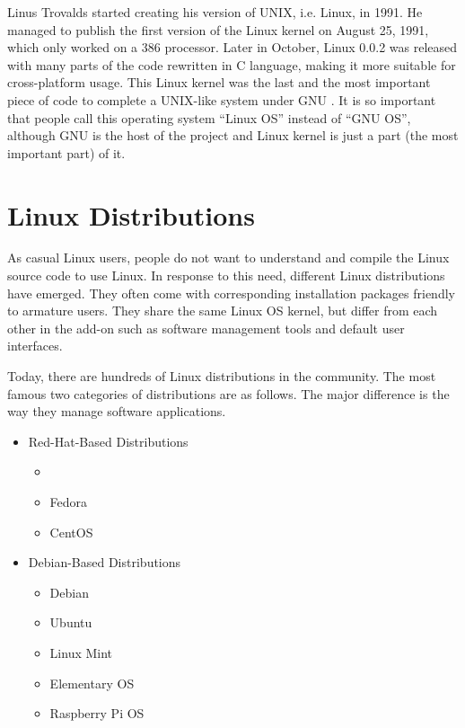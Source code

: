 Linus Trovalds started creating his version of UNIX, i.e. Linux, in 1991. He managed to publish the first version of the Linux kernel on August 25, 1991, which only worked on a 386 processor. Later in October, Linux 0.0.2 was released with many parts of the code rewritten in C language, making it more suitable for cross-platform usage. This Linux kernel was the last and the most important piece of code to complete a UNIX-like system under GNU . It is so important that people call this operating system ``Linux OS'' instead of ``GNU OS'', although GNU is the host of the project and Linux kernel is just a part (the most important part) of it.

\section{Linux Distributions}

As casual Linux users, people do not want to understand and compile the Linux source code to use Linux. In response to this need, different Linux distributions have emerged. They often come with corresponding installation packages friendly to armature users. They share the same Linux OS kernel, but differ from each other in the add-on such as software management tools and default user interfaces.

Today, there are hundreds of Linux distributions in the community. The most famous two categories of distributions are as follows. The major difference is the way they manage software applications.
\begin{itemize}
  \item Red-Hat-Based Distributions
  \begin{itemize}
    \item {}
    \item Fedora
    \item CentOS
  \end{itemize}
  \item Debian-Based Distributions
  \begin{itemize}
    \item Debian
    \item Ubuntu
    \item Linux Mint
    \item Elementary OS
    \item Raspberry Pi OS
  \end{itemize}
\end{itemize}

